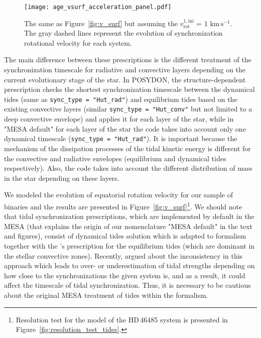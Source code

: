 \documentclass{aa}
\newcommand{\kms}{$\mathrm{km\,s^{-1}}$}
\DeclareRobustCommand{\Figref}[1]{Figure~\ref{#1}}
\begin{document}
\begin{figure}[!ht]
  \centering
  \texttt{[image: age\_vsurf\_acceleration\_panel.pdf]}
  \caption{The same as \Figref{fig:v_surf} but assuming the $v_\mathrm{rot}^\mathrm{1,ini}$ = 1 \kms. The gray dashed lines represent the evolution of synchronization rotational velocity for each system.}
  \label{fig:v_surf_acceleration}
\end{figure}



The main difference between these prescriptions is the different treatment of the synchronization timescale for radiative and convective layers depending on the
current evolutionary stage of the star.
 In POSYDON, the structure-dependent prescription checks the shortest synchronization timescale between the dynamical tides (same as \texttt{sync\_type = "Hut\_rad"}) and equilibrium tides based on the existing convective layers (similar \texttt{sync\_type = "Hut\_conv"} but not limited to a deep convective envelope) and applies it for each layer of the star, while in "MESA default" for each layer of the star the code takes into account only one dynamical timescale (\texttt{sync\_type = "Hut\_rad"}).
It is important because the mechanism of the dissipation processes of the tidal kinetic energy is different for the convective and radiative envelopes (equilibrium and dynamical tides respectively).
 Also, the code takes into account the different distribution of mass in the star depending on these
layers.

We modeled the evolution of equatorial rotation velocity for
our sample of binaries and the results are presented in \Figref{fig:v_surf}\footnote{Resolution test for the model of the HD\,46485 system is presented in \Figref{fig:resolution_test_tides}.}.
We should note that \citet{Hurley_2002} tidal synchronization prescriptions, which are implemented by default in the MESA (that explains the origin of our nomenclature "MESA default" in the text and figures), consist of \citet{Zahn_1977} dynamical tides solution which is adapted to \citet{Hut_1981} formalism together with the \citeauthor{Hut_1981}'s prescription for the equilibrium tides (which are dominant in the stellar convective zones).
Recently, \citet{Sciarini_2024} argued about the inconsistency in this approach which leads to over- or underestimation of tidal strengths depending on how close to the synchronizations the given system is, and as a result, it could affect the timescale of tidal synchronization.
Thus, it is necessary to be cautious about the original MESA treatment of tides within the \citeauthor{Hurley_2002} formalism.
\end{document}
